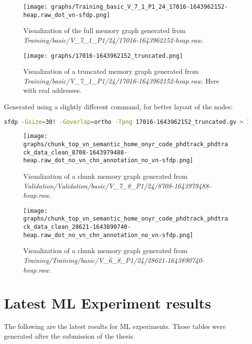 \begin{figure}[H]\label{appendix:mem_graph:17016-1643962152:full}
    \centering
    \texttt{[image: graphs/Training\_basic\_V\_7\_1\_P1\_24\_17016-1643962152-heap.raw\_dot\_vn-sfdp.png]}
    \caption{Visualization of the full memory graph generated from \textit{Training/basic/V\_7\_1\_P1/24/17016-1643962152-heap.raw}.}
\end{figure}

\begin{figure}[H]\label{appendix:mem_graph:17016-1643962152:truncated}
    \centering
    \texttt{[image: graphs/17016-1643962152\_truncated.png]}
    \caption{Visualization of a truncated memory graph generated from \textit{Training/basic/V\_7\_1\_P1/24/17016-1643962152-heap.raw}. Here with real addresses.}
\end{figure}

Generated using a slightly different command, for better layout of the nodes:

\begin{lstlisting}[language=bash, caption={Command used to generate the memory graph visualization of \textit{Training/basic/V\_7\_1\_P1/24/17016-1643962152-heap.raw} here using real addresses.}]
    sfdp -Gsize=30! -Goverlap=ortho -Tpng 17016-1643962152_truncated.gv > 17016-1643962152_truncated.png
\end{lstlisting}

\begin{figure}[H]
    \centering
    \texttt{[image: graphs/chunk\_top\_vn\_semantic\_home\_onyr\_code\_phdtrack\_phdtrack\_data\_clean\_8708-1643979488-heap.raw\_dot\_no\_vn\_chn\_annotation\_no\_vn-sfdp.png]}
    \caption{Visualization of a chunk memory graph generated from \textit{Validation/Validation/basic/V\_7\_8\_P1/24/8708-1643979488-heap.raw}.}
\end{figure}

\begin{figure}[H]
    \centering
    \texttt{[image: graphs/chunk\_top\_vn\_semantic\_home\_onyr\_code\_phdtrack\_phdtrack\_data\_clean\_28621-1643890740-heap.raw\_dot\_no\_vn\_chn\_annotation\_no\_vn-sfdp.png]}
    \caption{Visualization of a chunk memory graph generated from \textit{Training/Training/basic/V\_6\_8\_P1/24/28621-1643890740-heap.raw}.}
\end{figure}

\section{Latest ML Experiment results}
The following are the latest results for ML experiments. Those tables were generated after the submission of the thesis.

